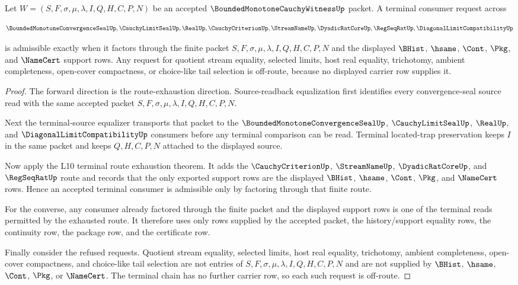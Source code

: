 \begin{theorem}
\label{thm:bounded-monotone-cauchy-witness-l10-terminal-route-refusal-completeness}
Let $W=(S,F,\sigma,\mu,\lambda,I,Q,H,C,P,N)$ be an accepted $\BoundedMonotoneCauchyWitnessUp$ packet. A terminal consumer request across

$$
\BoundedMonotoneConvergenceSealUp,\CauchyLimitSealUp,\RealUp,\CauchyCriterionUp,\StreamNameUp,\DyadicRatCoreUp,\RegSeqRatUp,\DiagonalLimitCompatibilityUp
$$

is admissible exactly when it factors through the finite packet $S,F,\sigma,\mu,\lambda,I,Q,H,C,P,N$ and the displayed $\BHist$, $\hsame$, $\Cont$, $\Pkg$, and $\NameCert$ support rows. Any request for quotient stream equality, selected limits, host real equality, trichotomy, ambient completeness, open-cover compactness, or choice-like tail selection is off-route, because no displayed carrier row supplies it.
\end{theorem}
\begin{proof}
The forward direction is the route-exhaustion direction. Source-readback equalization first identifies every convergence-seal source read with the same accepted packet $S,F,\sigma,\mu,\lambda,I,Q,H,C,P,N$.

Next the terminal-source equalizer transports that packet to the $\BoundedMonotoneConvergenceSealUp$, $\CauchyLimitSealUp$, $\RealUp$, and $\DiagonalLimitCompatibilityUp$ consumers before any terminal comparison can be read. Terminal located-trap preservation keeps $I$ in the same packet and keeps $Q,H,C,P,N$ attached to the displayed source.

Now apply the L10 terminal route exhaustion theorem. It adds the $\CauchyCriterionUp$, $\StreamNameUp$, $\DyadicRatCoreUp$, and $\RegSeqRatUp$ route and records that the only exported support rows are the displayed $\BHist$, $\hsame$, $\Cont$, $\Pkg$, and $\NameCert$ rows. Hence an accepted terminal consumer is admissible only by factoring through that finite route.

For the converse, any consumer already factored through the finite packet and the displayed support rows is one of the terminal reads permitted by the exhausted route. It therefore uses only rows supplied by the accepted packet, the history/support equality rows, the continuity row, the package row, and the certificate row.

Finally consider the refused requests. Quotient stream equality, selected limits, host real equality, trichotomy, ambient completeness, open-cover compactness, and choice-like tail selection are not entries of $S,F,\sigma,\mu,\lambda,I,Q,H,C,P,N$ and are not supplied by $\BHist$, $\hsame$, $\Cont$, $\Pkg$, or $\NameCert$. The terminal chain has no further carrier row, so each such request is off-route.
\end{proof}

